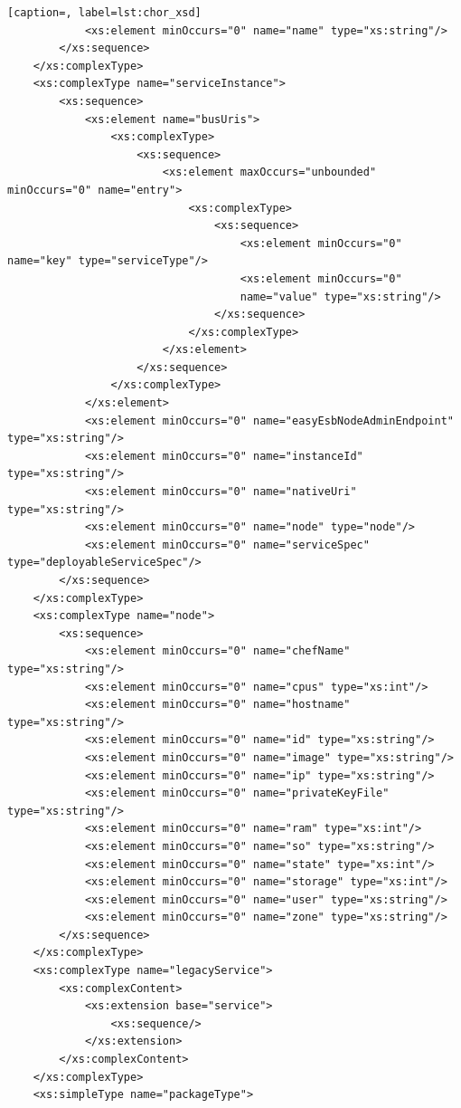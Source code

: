 \documentclass[a4paper, 10pt]{article}
\begin{document}
{\begin{lstlisting}[caption=, label=lst:chor_xsd]
            <xs:element minOccurs="0" name="name" type="xs:string"/>
        </xs:sequence>
    </xs:complexType>
    <xs:complexType name="serviceInstance">
        <xs:sequence>
            <xs:element name="busUris">
                <xs:complexType>
                    <xs:sequence>
                        <xs:element maxOccurs="unbounded" minOccurs="0" name="entry">
                            <xs:complexType>
                                <xs:sequence>
                                    <xs:element minOccurs="0" name="key" type="serviceType"/>
                                    <xs:element minOccurs="0"
                                    name="value" type="xs:string"/>
                                </xs:sequence>
                            </xs:complexType>
                        </xs:element>
                    </xs:sequence>
                </xs:complexType>
            </xs:element>
            <xs:element minOccurs="0" name="easyEsbNodeAdminEndpoint" type="xs:string"/>
            <xs:element minOccurs="0" name="instanceId" type="xs:string"/>
            <xs:element minOccurs="0" name="nativeUri" type="xs:string"/>
            <xs:element minOccurs="0" name="node" type="node"/>
            <xs:element minOccurs="0" name="serviceSpec" type="deployableServiceSpec"/>
        </xs:sequence>
    </xs:complexType>
    <xs:complexType name="node">
        <xs:sequence>
            <xs:element minOccurs="0" name="chefName" type="xs:string"/>
            <xs:element minOccurs="0" name="cpus" type="xs:int"/>
            <xs:element minOccurs="0" name="hostname" type="xs:string"/>
            <xs:element minOccurs="0" name="id" type="xs:string"/>
            <xs:element minOccurs="0" name="image" type="xs:string"/>
            <xs:element minOccurs="0" name="ip" type="xs:string"/>
            <xs:element minOccurs="0" name="privateKeyFile" type="xs:string"/>
            <xs:element minOccurs="0" name="ram" type="xs:int"/>
            <xs:element minOccurs="0" name="so" type="xs:string"/>
            <xs:element minOccurs="0" name="state" type="xs:int"/>
            <xs:element minOccurs="0" name="storage" type="xs:int"/>
            <xs:element minOccurs="0" name="user" type="xs:string"/>
            <xs:element minOccurs="0" name="zone" type="xs:string"/>
        </xs:sequence>
    </xs:complexType>
    <xs:complexType name="legacyService">
        <xs:complexContent>
            <xs:extension base="service">
                <xs:sequence/>
            </xs:extension>
        </xs:complexContent>
    </xs:complexType>
    <xs:simpleType name="packageType">

\end{lstlisting}}
\end{document}
